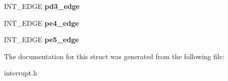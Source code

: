 \begin{DoxyCompactItemize}
\mbox{\label{structINT__REG__CALLBACK_ad6405304b424fe3dc843c17582538633}} 
I\+N\+T\+\_\+\+E\+D\+GE {\bfseries pd3\+\_\+edge}
\item 
\mbox{\label{structINT__REG__CALLBACK_a56c033a69ca99c16108e525437dc55c3}} 
I\+N\+T\+\_\+\+E\+D\+GE {\bfseries pe4\+\_\+edge}
\item 
\mbox{\label{structINT__REG__CALLBACK_ad192d736896bae445961e765a3ee816c}} 
I\+N\+T\+\_\+\+E\+D\+GE {\bfseries pe5\+\_\+edge}
\end{DoxyCompactItemize}


The documentation for this struct was generated from the following file\+:\begin{DoxyCompactItemize}
\item 
interrupt.\+h\end{DoxyCompactItemize}
